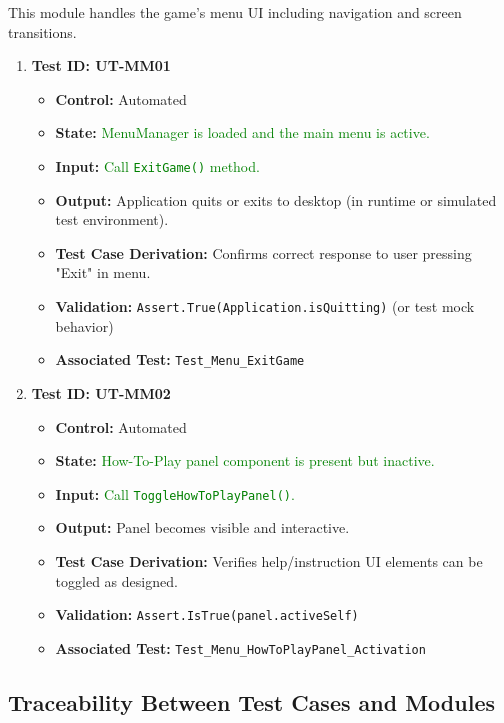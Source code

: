\documentclass[12pt]{article}
\newcommand{\added}[1]{\textcolor{green}{#1}}
\begin{document}
This module handles the game’s menu UI including navigation and screen transitions.

\begin{enumerate}
    \item \textbf{Test ID: UT-MM01}
    \begin{itemize}
        \item \textbf{Control:} Automated
        \item \textbf{State:} \added{MenuManager is loaded and the main menu is active.}
        \item \textbf{Input:} \added{Call \texttt{ExitGame()} method.}
        \item \textbf{Output:} Application quits or exits to desktop (in runtime or simulated test environment).
        \item \textbf{Test Case Derivation:} Confirms correct response to user pressing "Exit" in menu.
        \item \textbf{Validation:} \texttt{Assert.True(Application.isQuitting)} (or test mock behavior)
        \item \textbf{Associated Test:} \texttt{Test\_Menu\_ExitGame}
    \end{itemize}

    \item \textbf{Test ID: UT-MM02}
    \begin{itemize}
        \item \textbf{Control:} Automated
        \item \textbf{State:} \added{How-To-Play panel component is present but inactive.}
        \item \textbf{Input:} \added{Call \texttt{ToggleHowToPlayPanel()}.}
        \item \textbf{Output:} Panel becomes visible and interactive.
        \item \textbf{Test Case Derivation:} Verifies help/instruction UI elements can be toggled as designed.
        \item \textbf{Validation:} \texttt{Assert.IsTrue(panel.activeSelf)}
        \item \textbf{Associated Test:} \texttt{Test\_Menu\_HowToPlayPanel\_Activation}
    \end{itemize}
\end{enumerate}

\subsection{Traceability Between Test Cases and Modules}
\end{document}
